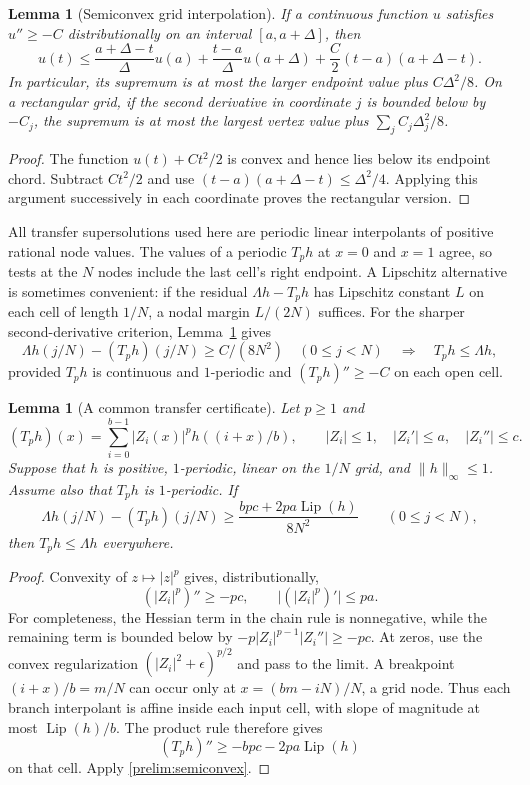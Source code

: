 \documentclass[11pt,a4paper]{article}
\theoremstyle{paperplain}
\newtheorem{lemma}[theorem]{Lemma}
\numberwithin{equation}{section}
\begin{document}
\begin{lemma}[Semiconvex grid interpolation]\label{prelim:grid}
If a continuous function $u$ satisfies $u''\geqslant-C$ distributionally
on an interval $[a,a+\Delta]$, then
\[
 u(t)\leqslant
 \frac{a+\Delta-t}{\Delta}u(a)+
 \frac{t-a}{\Delta}u(a+\Delta)
 +\frac C2(t-a)(a+\Delta-t).
\]
In particular, its supremum is at most the larger endpoint value plus
$C\Delta^2/8$. On a rectangular grid, if the second derivative in coordinate
$j$ is bounded below by $-C_j$, the supremum is at most the largest vertex
value plus $\sum_jC_j\Delta_j^2/8$.
\end{lemma}
\begin{proof}
The function $u(t)+Ct^2/2$ is convex and hence lies below its endpoint
chord. Subtract $Ct^2/2$ and use
$(t-a)(a+\Delta-t)\leqslant\Delta^2/4$. Applying this argument successively
in each coordinate proves the rectangular version.
\end{proof}

All transfer supersolutions used here are periodic linear interpolants
of positive rational node values. The values of a periodic $T_ph$ at
$x=0$ and $x=1$ agree, so tests at the $N$ nodes include the last cell's
right endpoint. A Lipschitz alternative is sometimes convenient:
if the residual $\Lambda h-T_ph$ has Lipschitz constant $L$ on each
cell of length $1/N$, a nodal margin $L/(2N)$ suffices.
For the sharper second-derivative criterion, Lemma~\ref{prelim:grid} gives
\begin{equation}\label{prelim:semiconvex}
 \Lambda h(j/N)-(T_ph)(j/N)\geqslant C/(8N^2)
 \quad(0\leqslant j<N)
 \quad\Longrightarrow\quad T_ph\leqslant\Lambda h,
\end{equation}
provided $T_ph$ is continuous and $1$-periodic and
$(T_ph)''\geqslant-C$ on each open cell.

\begin{lemma}[A common transfer certificate]\label{prelim:operator-cert}
Let $p\geqslant1$ and
\[
 (T_ph)(x)=\sum_{i=0}^{b-1}|Z_i(x)|^p h((i+x)/b),
 \qquad |Z_i|\leqslant1,\quad |Z_i'|\leqslant a,\quad |Z_i''|\leqslant c.
\]
Suppose that $h$ is positive, $1$-periodic, linear on the $1/N$ grid,
and $\|h\|_\infty\leqslant1$. Assume also that $T_ph$ is
$1$-periodic. If
\[
 \Lambda h(j/N)-(T_ph)(j/N)
 \geqslant\frac{bpc+2pa\operatorname{Lip}(h)}{8N^2}
 \qquad(0\leqslant j<N),
\]
then $T_ph\leqslant\Lambda h$ everywhere.
\end{lemma}
\begin{proof}
Convexity of $z\mapsto|z|^p$ gives, distributionally,
\[
 (|Z_i|^p)''\geqslant-pc,\qquad
 \bigl|(|Z_i|^p)'\bigr|\leqslant pa.
\]
For completeness, the Hessian term in the chain rule is nonnegative,
while the remaining term is bounded below by
$-p|Z_i|^{p-1}|Z_i''|\geqslant-pc$. At zeros, use the convex
regularization $(|Z_i|^2+\epsilon)^{p/2}$ and pass to the limit.
A breakpoint $(i+x)/b=m/N$ can occur only at $x=(bm-iN)/N$,
a grid node. Thus each branch interpolant is affine inside each input
cell, with slope of magnitude at most $\operatorname{Lip}(h)/b$.
The product rule therefore gives
\[
 (T_ph)''\geqslant-bpc-2pa\operatorname{Lip}(h)
\]
on that cell. Apply \eqref{prelim:semiconvex}.
\end{proof}
\end{document}
